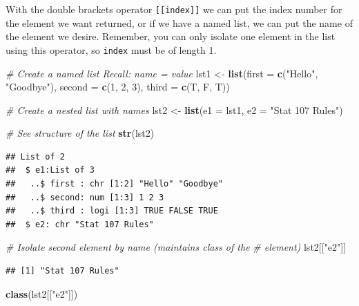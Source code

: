 \documentclass[
]{book}
\newenvironment{Shaded}{\begin{snugshade}}{\end{snugshade}}
\newcommand{\CommentTok}[1]{\textcolor[rgb]{0.56,0.35,0.01}{\textit{#1}}}
\newcommand{\DataTypeTok}[1]{\textcolor[rgb]{0.13,0.29,0.53}{#1}}
\newcommand{\DecValTok}[1]{\textcolor[rgb]{0.00,0.00,0.81}{#1}}
\newcommand{\KeywordTok}[1]{\textcolor[rgb]{0.13,0.29,0.53}{\textbf{#1}}}
\newcommand{\NormalTok}[1]{#1}
\newcommand{\StringTok}[1]{\textcolor[rgb]{0.31,0.60,0.02}{#1}}
\begin{document}
With the double brackets operator \texttt{{[}{[}index{]}{]}} we can put the index number for the element we want returned, or if we have a named list, we can put the name of the element we desire. Remember, you can only isolate one element in the list using this operator, so \texttt{index} must be of length 1.

\begin{Shaded}
\begin{Highlighting}[]
\CommentTok{# Create a named list Recall: name = value}
\NormalTok{lst1 <-}\StringTok{ }\KeywordTok{list}\NormalTok{(}\DataTypeTok{first =} \KeywordTok{c}\NormalTok{(}\StringTok{"Hello"}\NormalTok{, }\StringTok{"Goodbye"}\NormalTok{), }\DataTypeTok{second =} \KeywordTok{c}\NormalTok{(}\DecValTok{1}\NormalTok{, }\DecValTok{2}\NormalTok{,}
    \DecValTok{3}\NormalTok{), }\DataTypeTok{third =} \KeywordTok{c}\NormalTok{(T, F, T))}

\CommentTok{# Create a nested list with names}
\NormalTok{lst2 <-}\StringTok{ }\KeywordTok{list}\NormalTok{(}\DataTypeTok{e1 =}\NormalTok{ lst1, }\DataTypeTok{e2 =} \StringTok{"Stat 107 Rules"}\NormalTok{)}

\CommentTok{# See structure of the list}
\KeywordTok{str}\NormalTok{(lst2)}
\end{Highlighting}
\end{Shaded}

\begin{verbatim}
## List of 2
##  $ e1:List of 3
##   ..$ first : chr [1:2] "Hello" "Goodbye"
##   ..$ second: num [1:3] 1 2 3
##   ..$ third : logi [1:3] TRUE FALSE TRUE
##  $ e2: chr "Stat 107 Rules"
\end{verbatim}

\begin{Shaded}
\begin{Highlighting}[]
\CommentTok{# Isolate second element by name (maintains class of the}
\CommentTok{# element)}
\NormalTok{lst2[[}\StringTok{"e2"}\NormalTok{]]}
\end{Highlighting}
\end{Shaded}

\begin{verbatim}
## [1] "Stat 107 Rules"
\end{verbatim}

\begin{Shaded}
\begin{Highlighting}[]
\KeywordTok{class}\NormalTok{(lst2[[}\StringTok{"e2"}\NormalTok{]])}
\end{Highlighting}
\end{Shaded}
\end{document}
